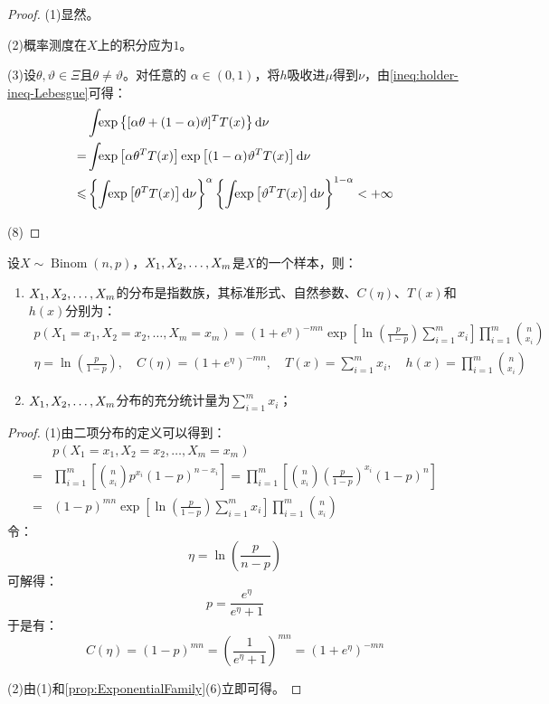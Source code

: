 \begin{proof}
	(1)显然。\par
	(2)概率测度在$X$上的积分应为$1$。\par
	(3)设$\theta,\vartheta\in\Xi$且$\theta\ne\vartheta$。对任意的 $\alpha\in(0,1)$，将$h$吸收进$\mu$得到$\nu$，由\cref{ineq:holder-ineq-Lebesgue}可得：
	\begin{align*}
		&\int_{}\exp\left\{[\alpha\theta+(1-\alpha)\vartheta]^TT(x)\right\}\mathop{}\!\mathrm{d}\nu \\
		=&\int_{}\exp\left[\alpha\theta^TT(x)\right]\exp\left[(1-\alpha)\vartheta^TT(x)\right]\mathop{}\!\mathrm{d}\nu \\
		\leqslant&\left\{\int_{}\exp\left[\theta^TT(x)\right]\mathop{}\!\mathrm{d}\nu\right\}^{\alpha}\left\{\int_{}\exp\left[\vartheta^TT(x)\right]\mathop{}\!\mathrm{d}\nu\right\}^{1-\alpha}<+\infty
	\end{align*}\par
	(8)
\end{proof}
\begin{theorem}
	设$X\sim\operatorname{Binom}(n,p)$，$X_1, X_2, \dots, X_{m}$是$X$的一个样本，则：
	\begin{enumerate}
		\item $X_1, X_2, \dots, X_{m}$的分布是指数族，其标准形式、自然参数、$C(\eta)$、$T(x)$和$h(x)$分别为：
		\begin{gather*}
			p(X_1=x_1,X_2=x_2,\dots,X_m=x_m)=(1+e^{\eta})^{-mn}\exp\left[\ln\left(\frac{p}{1-p}\right)\sum_{i=1}^{m}x_i\right]\prod_{i=1}^{m}\binom{n}{x_i} \\
			\eta=\ln\left(\frac{p}{1-p}\right),\quad C(\eta)=(1+e^{\eta})^{-mn},\quad T(x)=\sum_{i=1}^{m}x_i,\quad h(x)=\prod_{i=1}^{m}\binom{n}{x_i}
		\end{gather*}
		\item $X_1, X_2, \dots, X_{m}$分布的充分统计量为$\sum\limits_{i=1}^{m}x_i$；
	\end{enumerate}
\end{theorem}
\begin{proof}
	(1)由二项分布的定义可以得到：
	\begin{align*}
		&p(X_1=x_1,X_2=x_2,\dots,X_m=x_m) \\
		=&\prod_{i=1}^{m}\left[\binom{n}{x_i}p^{x_i}(1-p)^{n-x_i}\right]=\prod_{i=1}^{m}\left[\binom{n}{x_i}\left(\frac{p}{1-p}\right)^{x_i}(1-p)^n\right] \\
		=&(1-p)^{mn}\exp\left[\ln\left(\frac{p}{1-p}\right)\sum_{i=1}^{m}x_i\right]\prod_{i=1}^{m}\binom{n}{x_i}
	\end{align*}
	令：
	\begin{equation*}
		\eta=\ln\left(\frac{p}{n-p}\right)
	\end{equation*}
	可解得：
	\begin{equation*}
		p=\frac{e^{\eta}}{e^{\eta}+1}
	\end{equation*}
	于是有：
	\begin{equation*}
		C(\eta)=(1-p)^{mn}=\left(\frac{1}{e^{\eta}+1}\right)^{mn}=(1+e^{\eta})^{-mn}
	\end{equation*}\par
	(2)由(1)和\cref{prop:ExponentialFamily}(6)立即可得。
\end{proof}

